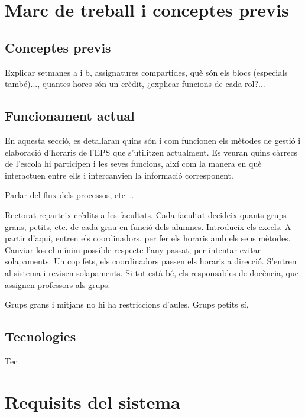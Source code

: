 \documentclass[a4paper,12pt]{ThesisStyle}
\begin{document}
\chapter{Marc de treball i conceptes previs}  %
\label{cap:marcdetreball}

\section{Conceptes previs}
\label{sec:conceptes_previs}
Explicar setmanes a i b, assignatures compartides, què són els blocs (especials també)..., quantes hores
són un crèdit, ¿explicar funcions de cada rol?...

\section{Funcionament actual}
\label{sec:funcionament_actual}

En aquesta secció, es detallaran quins són i com funcionen els mètodes de gestió i elaboració d'horaris de l'EPS que s'utilitzen actualment. Es veuran quins càrrecs de l'escola hi participen i les seves funcions, així com la manera en què interactuen entre ells i intercanvien la informació corresponent.

Parlar del flux dels processos, etc \ldots

Rectorat reparteix crèdits a les facultats. Cada facultat decideix quants grups grans, petits, etc. de cada grau en funció dels alumnes. Introdueix els excels.
A partir d'aquí, entren els coordinadors, per fer els horaris amb els seus mètodes. Canviar-los el mínim possible respecte l'any passat, per intentar evitar
solapaments. Un cop fets, els coordinadors passen els horaris a direcció. S'entren al sistema i revisen solapaments. Si tot està bé, els responsables de docència,
que assignen professors als grups.

Grups grans i mitjans no hi ha restriccions d'aules. Grups petits sí,

\section{Tecnologies}
\label{sec:tecnologies}

Tec

\chapter{Requisits del sistema}
\label{cap:requisits}
\end{document}
